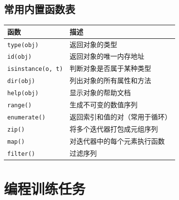 \documentclass{article}
\begin{document}
\subsection{常用内置函数表}
\begin{longtable}{lp{10cm}}
\toprule
\textbf{函数} & \textbf{描述} \\
\midrule
\texttt{type(obj)} & 返回对象的类型 \\
\texttt{id(obj)} & 返回对象的唯一内存地址 \\
\texttt{isinstance(o, t)} & 判断对象是否属于某种类型 \\
\texttt{dir(obj)} & 列出对象的所有属性和方法 \\
\texttt{help(obj)} & 显示对象的帮助文档 \\
\texttt{range()} & 生成不可变的数值序列 \\
\texttt{enumerate()} & 返回索引和值的对（常用于循环） \\
\texttt{zip()} & 将多个迭代器打包成元组序列 \\
\texttt{map()} & 对迭代器中的每个元素执行函数 \\
\texttt{filter()} & 过滤序列 \\
\bottomrule
\end{longtable}

\section{编程训练任务}
\end{document}
